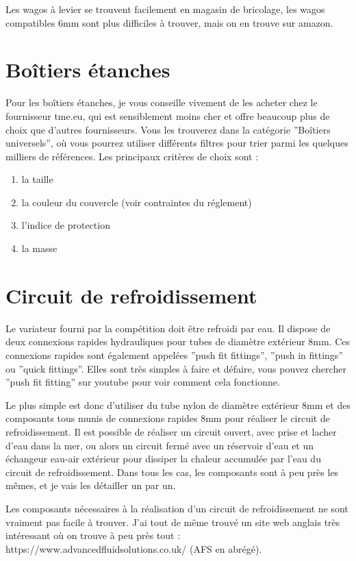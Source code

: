 \documentclass[a4paper, 11pt]{report}
\begin{document}
Les wagos à levier se trouvent facilement en magasin de bricolage,
les wagos compatibles 6mm sont plus difficiles à
trouver, mais on en trouve sur amazon.

\chapter{Boîtiers étanches}

Pour les boîtiers étanches, je vous conseille vivement de les acheter
chez le fournisseur tme.eu, qui est sensiblement moins cher et offre
beaucoup plus de choix que d'autres fournisseurs. Vous les trouverez
dans la catégorie ''Boîtiers universels'', où vous pourrez utiliser
différents filtres pour trier parmi les quelques milliers de références.
Les principaux critères de choix sont :
\begin{enumerate}
\item la taille
\item la couleur du couvercle (voir contraintes du réglement)
\item l'indice de protection
\item la masse
\end{enumerate}

\chapter{Circuit de refroidissement}

Le variateur fourni par la compétition doit être refroidi par eau.
Il dispose de deux connexions rapides hydrauliques pour tubes de diamètre
extérieur 8mm. Ces connexions rapides sont également appelées ''push
fit fittings'', ''push in fittings'' ou ''quick fittings''. Elles
sont très simples à faire et défaire, vous pouvez chercher ''push
fit fitting'' sur youtube pour voir comment cela fonctionne.

Le plus simple est donc d'utiliser du tube nylon de diamètre extérieur
8mm et des composants tous munis de connexions rapides 8mm pour réaliser
le circuit de refroidissement. Il est possible de réaliser un circuit
ouvert, avec prise et lacher d'eau dans la mer, ou alors un circuit
fermé avec un réservoir d'eau et un échangeur eau-air extérieur pour
dissiper la chaleur accumulée par l'eau du circuit de refroidissement.
Dans tous les cas, les composants sont à peu près les mêmes, et je
vais les détailler un par un.

Les composants nécessaires à la réalisation d'un circuit de refroidissement
ne sont vraiment pas facile à trouver. J'ai tout de même trouvé un
site web anglais très intéressant où on trouve à peu près tout : https://www.advancedfluidsolutions.co.uk/
(AFS en abrégé).
\end{document}
